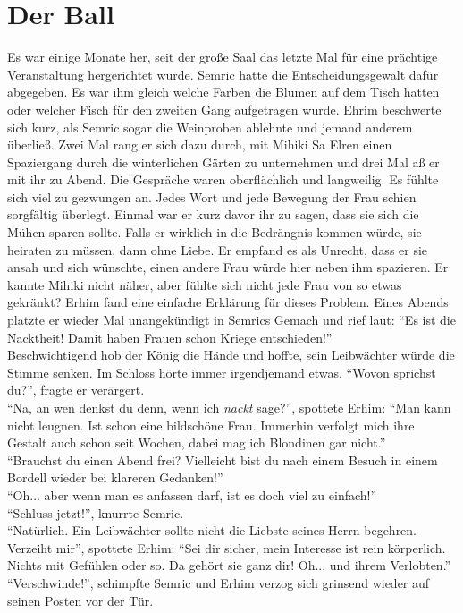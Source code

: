 \chapter{Der Ball}

Es war einige Monate her, seit der große Saal das letzte Mal für eine prächtige Veranstaltung 
hergerichtet wurde. Semric hatte die Entscheidungsgewalt dafür abgegeben. Es war ihm gleich welche 
Farben die Blumen auf dem Tisch hatten oder welcher Fisch für den zweiten Gang aufgetragen wurde. 
Ehrim beschwerte sich kurz, als Semric sogar die Weinproben ablehnte und jemand anderem überließ. 
Zwei Mal rang er sich dazu durch, mit Mihiki Sa Elren einen Spaziergang durch die winterlichen 
Gärten zu unternehmen und drei Mal aß er mit ihr zu Abend. Die Gespräche waren oberflächlich und 
langweilig. Es fühlte sich viel zu gezwungen an. Jedes Wort und jede Bewegung der Frau schien 
sorgfältig überlegt. Einmal war er kurz davor ihr zu sagen, dass sie sich die Mühen sparen sollte. 
Falls er wirklich in die Bedrängnis kommen würde, sie heiraten zu müssen, dann ohne Liebe. Er 
empfand es als Unrecht, dass er sie ansah und sich wünschte, einen andere Frau würde hier neben ihm 
spazieren. Er kannte Mihiki nicht näher, aber fühlte sich nicht jede Frau von so etwas gekränkt? 
Erhim fand eine einfache Erklärung für dieses Problem. Eines Abends platzte er wieder Mal 
unangekündigt in Semrics Gemach und rief laut: ``Es ist die Nacktheit! Damit haben Frauen schon 
Kriege entschieden!''\\
Beschwichtigend hob der König die Hände und hoffte, sein Leibwächter würde die Stimme senken. Im 
Schloss hörte immer irgendjemand etwas. ``Wovon sprichst du?'', fragte er verärgert.\\
``Na, an wen denkst du denn, wenn ich \textit{nackt} sage?'', spottete Erhim: ``Man kann nicht 
leugnen. Ist schon eine bildschöne Frau. Immerhin verfolgt mich ihre Gestalt auch schon seit 
Wochen, dabei mag ich Blondinen gar nicht.''\\
``Brauchst du einen Abend frei? Vielleicht bist du nach einem Besuch in einem Bordell wieder bei 
klareren Gedanken!''\\
``Oh... aber wenn man es anfassen darf, ist es doch viel zu einfach!''\\
``Schluss jetzt!'', knurrte Semric.\\
``Natürlich. Ein Leibwächter sollte nicht die Liebste seines Herrn begehren. Verzeiht mir'', 
spottete Erhim: ``Sei dir sicher, mein Interesse ist rein körperlich. Nichts mit Gefühlen oder so. 
Da gehört sie ganz dir! Oh... und ihrem Verlobten.''\\
``Verschwinde!'', schimpfte Semric und Erhim verzog sich grinsend wieder auf seinen Posten vor der 
Tür.\\

